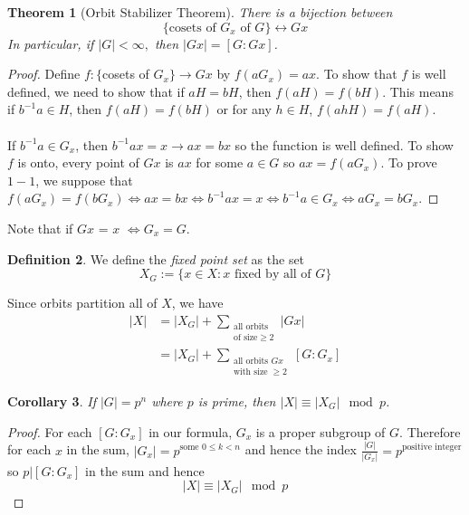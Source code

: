 \documentclass{article}
\newtheorem{theorem}{Theorem}[section]
\newtheorem{corollary}[theorem]{Corollary}
\theoremstyle{definition}
\newtheorem{definition}[theorem]{Definition}
\begin{document}
\begin{theorem}[Orbit Stabilizer Theorem]
    There is a bijection between 
    \begin{equation*}
         \{ \text{cosets of }G_x \text{ of } G\} \longleftrightarrow Gx
    \end{equation*}
    In particular, if $|G|<\infty,$ then $|Gx| = [G:Gx]$.
\end{theorem}
\begin{proof}
    Define $f:\{$cosets of $G_x\} \to Gx$ by $f(aG_x) = ax$. To show that $f$ is well defined, we need to show that if $aH=bH$, then $f(aH)=f(bH)$. This means if $b^{-1}a\in H$, then $f(aH)=f(bH)$ or for any $h\in H$, $f(ahH) = f(aH)$. \\\\
    If $b^{-1}a \in G_x$, then $b^{-1}ax=x \to ax=bx$ so the function is well defined. To show $f$ is onto, every point of $Gx$ is $ax$ for some $a\in G$ so $ax = f(aG_x)$. To prove $1-1$, we suppose that $f(aG_x) = f(bG_x) \iff ax=bx \iff  b^{-1}ax=x \iff b^{-1}a\in G_x \iff aG_x = bG_x$. 
\end{proof}
Note that if {$Gx$} = {$x$} $\iff G_x =G$.
\begin{definition}
    We define the \emph{fixed point set} as the set 
    \begin{equation*}
        X_G := \{ x\in X: x \text{ fixed by all of } G\}
    \end{equation*}
\end{definition}
Since orbits partition all of $X$, we have 
\begin{equation*}
    \begin{split}
        |X| &= |X_G| + \sum_{\substack{\text{all orbits}\\\text{of size}\geq 2}} |Gx| \\
        &=|X_G| + \sum_{\substack{\text{all orbits }Gx\\\text{with size }\geq 2}} [G:G_x]
    \end{split}
\end{equation*}
\begin{corollary}
    If $|G| =p^n$ where $p$ is prime, then $|X| \equiv |X_G|\mod p$. \label{coro:3.37}
\end{corollary}
\begin{proof}
    For each $[G:G_x]$ in our formula, $G_x$ is a proper subgroup of $G$. Therefore for each $x$ in the sum, $|G_x| = p^{\text{some }0\leq k <n }$ and hence the index $\frac{|G|}{|G_x|} = p^{\text{positive integer}}$ so $p|[G:G_x]$ in the sum and hence 
    \begin{equation*}
        |X| \equiv |X_G| \mod p
    \end{equation*}
\end{proof}
\end{document}
